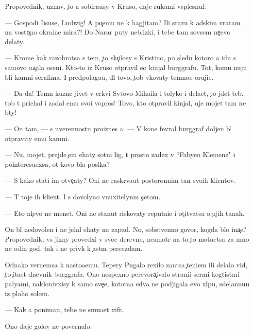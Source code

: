 \documentclass[10pt]{book}
\begin{document}
Propovednik, uznav, {\c}to {\y}a sobira{\y}usy v Kruso, daje rukami vsplesnul:

— Gospodi Iisuse, Ludwig! A po{\c}emu ne k hagjitam? Ili srazu k adskim vratam na vosto{\c}no{\y} okra{\y}ine mira?! Do Narar{\yi} puty neblizki{\y}, i tebe tam sovsem ne{\c}evo delaty.

— Krome kak razobratsa s tem, {\c}to slu{\c}ilosy s Kristino{\y}, po sledu kotoro{\y} {\y}a idu s samovo na{\c}ala oseni. Kto-to iz Kruso otpravil {\y}e{\y}o kinjal burggrafu. Tot, komu nujn{\yi} b{\yi}li kamni serafima. I predpolaga{\y}u, dl{\ia} tovo, {\c}tob{\yi} v{\yi}kovaty temno{\y}e oruji{\y}e.

— Da-da! Temn{\yi}{\y} kuzne{\q} jivet v {\q}erkvi Sv{\ia}tovo Miha{\y}ila i tolyko i dela{\y}et, {\c}to jdet teb{\ia}. {\C}tob{\yi} t{\yi} pri{\y}ehal i zadal {\y}emu svo{\y}i vopros{\yi}! Tovo, kto otpravil kinjal, uje mojet tam ne b{\yi}ty!

— On tam, — s uverennost{\y}u pro{\y}iznes {\y}a. — V kon{\q}e fevral{\ia} burggraf doljen b{\yi}l otpravity {\y}emu kamni.

— Nu, mojet, prejde {\c}em {\y}ehaty sotni lig, t{\yi} prosto za{\y}dex v ``Fabyen Klemenz" i po{\y}interesu{\y}exsa, ot kovo b{\yi}la pos{\yi}lka?

— S kako{\y} stati im otve{\c}aty? Oni ne raskr{\yi}va{\y}ut postoronnim ta{\y}n{\yi} svo{\y}ih kli{\y}entov.

— T{\yi} toje ih kli{\y}ent. I s dovolyno vnuxitelyn{\yi}m s{\c}etom.

— Eto ni{\c}evo ne men{\ia}{\y}et. Oni ne stanut riskovaty reputa{\q}i{\y}e{\y} i ot{\c}it{\yi}vatsa o {\c}ujih ta{\y}nah.

On b{\yi}l nedovolen i ne jelal {\y}ehaty na zapad. No, sobstvenno govor{\ia}, kogda b{\yi}lo ina{\c}e? Propovednik, vs{\iu} jizny provedxi{\y} v svo{\y}e{\y} derevne, nesmotr{\ia} na to {\c}to mota{\y}etsa za mno{\y} ne odin god, tak i ne priv{\yi}k k {\c}ast{\yi}m pere{\y}ezdam.

Odnako vernemsa k nasto{\y}a{\x}emu. Tepery Pugalo rexilo zan{\ia}tsa {\c}teni{\y}em ili delalo vid, {\c}to {\c}ita{\y}et dnevnik burggrafa. Ono nespexno perevora{\c}ivalo strani{\q}i ser{\yi}mi kogtist{\yi}mi paly{\q}ami, naklonivxisy k samo{\y} sve{\c}e, kotora{\y}a {\y}edva ne podjigala {\y}evo xl{\ia}pu, sdelannu{\y}u iz ploho{\y} solom{\yi}.

— Kak {\y}a ponima{\y}u, tebe ne smu{\x}a{\y}et xifr.

Ono daje golov{\yi} ne povernulo.
\end{document}
